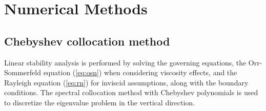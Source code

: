 \graphicspath{{figures/}}

\chapter{Numerical Methods}

\section{Chebyshev collocation method}
Linear stability analysis is performed by solving the governing equations, the Orr-Sommerfeld equation (\ref{eq:osn}) when considering viscosity effects, and the Rayleigh equation (\ref{eq:rn}) for inviscid assumptions, along with the boundary conditions. The spectral collocation method with Chebyshev polynomials is used to discretize the eigenvalue problem in the vertical direction. 

